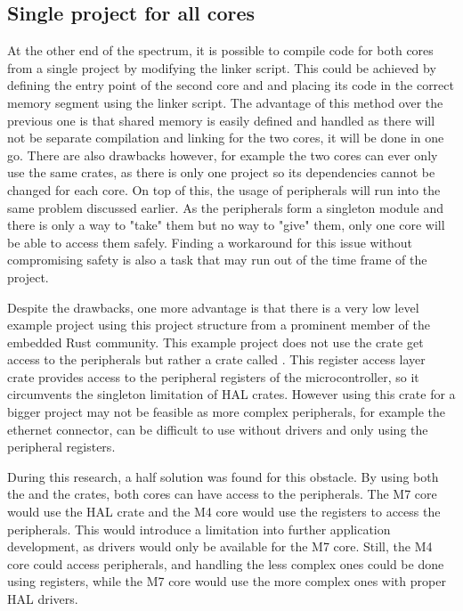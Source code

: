 \subsection{Single project for all cores}

At the other end of the spectrum, it is possible to compile code for both cores from a single project by modifying the linker script. This could be achieved by defining the entry point of the second core and and placing its code in the correct memory segment using the  linker script. The advantage of this method over the previous one is that shared memory is easily defined and handled as there will not be separate compilation and linking for the two cores, it will be done in one go. There are also drawbacks however, for example the two cores can ever only use the same crates, as there is only one project so its dependencies cannot be changed for each core. On top of this, the usage of peripherals will run into the same problem discussed earlier. As the peripherals form a singleton module and there is only a way to "take" them but no way to "give" them, only one core will be able to access them safely. Finding a workaround for this issue without compromising safety is also a task that may run out of the time frame of the project.

Despite the drawbacks, one more advantage is that there is a very low level example project using this project structure from a prominent member of the embedded Rust community. \cite{DualCoreDemo} This example project does not use the  crate get access to the peripherals but rather a crate called . This register access layer crate provides access to the peripheral registers of the microcontroller, so it circumvents the singleton limitation of HAL crates. However using this crate for a bigger project may not be feasible as more complex peripherals, for example the ethernet connector, can be difficult to use without drivers and only using the peripheral registers.

During this research, a half solution was found for this obstacle. By using both the  and the  crates, both cores can have access to the peripherals. The M7 core would use the HAL crate and the M4 core would use the registers to access the peripherals. This would introduce a limitation into further application development, as drivers would only be available for the M7 core. Still, the M4 core could access peripherals, and handling the less complex ones could be done using registers, while the M7 core would use the more complex ones with proper HAL drivers.

